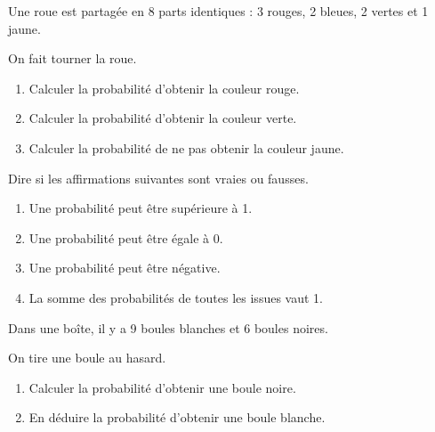 \documentclass[11pt]{article}
\begin{document}
\begin{exercice}

Une roue est partagée en 8 parts identiques :
3 rouges, 2 bleues, 2 vertes et 1 jaune.

On fait tourner la roue.

\begin{enumerate}
    \item Calculer la probabilité d'obtenir la couleur rouge.
    \item Calculer la probabilité d'obtenir la couleur verte.
    \item Calculer la probabilité de ne pas obtenir la couleur jaune.
\end{enumerate}

\end{exercice}


\begin{exercice}

Dire si les affirmations suivantes sont vraies ou fausses.

\begin{enumerate}
    \item Une probabilité peut être supérieure à 1.
    \item Une probabilité peut être égale à 0.
    \item Une probabilité peut être négative.
    \item La somme des probabilités de toutes les issues vaut 1.
\end{enumerate}

\end{exercice}


\newpage


\begin{exercice}

Dans une boîte, il y a 9 boules blanches et 6 boules noires.

On tire une boule au hasard.

\begin{enumerate}
    \item Calculer la probabilité d'obtenir une boule noire.
    \item En déduire la probabilité d'obtenir une boule blanche.
\end{enumerate}

\end{exercice}
\end{document}
